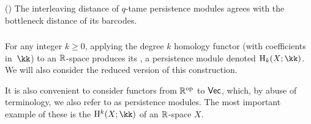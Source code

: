 

\medskip\theorem(\cite[Thm.~5.14]{chazal2016stability})
The interleaving distance of $q$-tame persistence modules agrees with the bottleneck distance of its barcodes.



\subsubsection{}

For any integer $k \geq 0$, applying the degree $k$ homology functor (with coefficients in~$\kk$) to an $\R$-space produces its , a persistence module denoted $\rH_k(X; \kk)$.
We will also consider the reduced version of this construction.

It is also convenient to consider functors from $\R^\op$ to $\Vec$, which, by abuse of terminology, we also refer to as persistence modules.
The most important example of these is the  $\rH^k(X; \kk)$ of an $\R$-space $X$.

